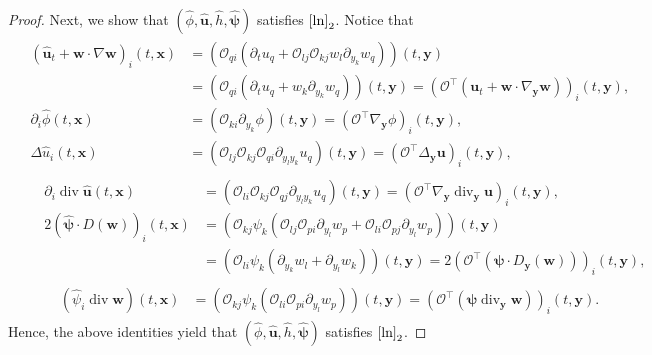 \documentclass[11pt,reqno]{amsart}
\DeclareMathOperator{\diver}{\mathrm{div}}
\numberwithin{rk}{section}
\numberwithin{prop}{section}
\numberwithin{mydef}{section}
\numberwithin{lem}{section}
\numberwithin{equation}{section}
\numberwithin{thm}{section}
\begin{document}
\begin{proof}
Next, we show that $(\hat\phi,\hat{\boldsymbol{u}},\hat h,\hat{\boldsymbol{\psi}})$ satisfies $\eqref{ln}_2$. 
Notice that
\begin{align*}
&\begin{aligned}
(\hat{\boldsymbol{u}}_t+\boldsymbol{w}\cdot\nabla\boldsymbol{w})_i(t,\boldsymbol{x})
&=(\mathcal{O}_{qi} (\partial_tu_q+\mathcal{O}_{lj}\mathcal{O}_{kj} w_l \partial_{y_k}w_q)) (t,\boldsymbol{y}) \\
&=(\mathcal{O}_{qi}(\partial_t u_q+ w_k \partial_{y_k}w_q)) (t,\boldsymbol{y})=(\mathcal{O}^\top (\boldsymbol{u}_t+\boldsymbol{w}\cdot\nabla_{\boldsymbol{y}} \boldsymbol{w}))_i(t,\boldsymbol{y}),\\
\partial_i\hat\phi(t,\boldsymbol{x})&=(\mathcal{O}_{ki}  \partial_{y_k}\phi) (t,\boldsymbol{y})=(\mathcal{O}^\top\nabla_{\boldsymbol{y}}\phi)_i(t,\boldsymbol{y}),\\
\Delta \hat{u}_i(t,\boldsymbol{x})&=(\mathcal{O}_{lj} \mathcal{O}_{kj} \mathcal{O}_{qi}\partial_{y_ly_k}u_q)(t,\boldsymbol{y}) =(\mathcal{O}^\top \Delta_{\boldsymbol{y}} \boldsymbol{u})_i(t,\boldsymbol{y}),
\end{aligned}\\
&  \, \,\,\, \, \,\begin{aligned}
\partial_i\diver\hat{\boldsymbol{u}}(t,\boldsymbol{x})&=(\mathcal{O}_{li}\mathcal{O}_{kj}\mathcal{O}_{qj}\partial_{y_ly_k}u_q)(t,\boldsymbol{y}) =(\mathcal{O}^\top \nabla_{\boldsymbol{y}}\diver_{\boldsymbol{y}}\boldsymbol{u})_i (t,\boldsymbol{y}),\\
2(\hat{\boldsymbol{\psi}}\cdot D(\boldsymbol{w}))_i(t,\boldsymbol{x})
&=(\mathcal{O}_{kj} \psi_k (\mathcal{O}_{lj}\mathcal{O}_{pi} \partial_{y_l}w_p+\mathcal{O}_{li}\mathcal{O}_{pj} \partial_{y_l}w_p))(t,\boldsymbol{y})\\
&=(\mathcal{O}_{li}\psi_k (\partial_{y_k}w_l+ \partial_{y_l}w_k))(t,\boldsymbol{y})=2(\mathcal{O}^\top(\boldsymbol{\psi}\cdot D_{\boldsymbol{y}}(\boldsymbol{w})))_i(t,\boldsymbol{y}),
\end{aligned}\\
&\quad \ \ \, \, \, \,\begin{aligned}
(\hat{\psi}_i\diver\boldsymbol{w})(t,\boldsymbol{x})
&=(\mathcal{O}_{kj} \psi_k (\mathcal{O}_{li}\mathcal{O}_{pi} \partial_{y_l}w_p))(t,\boldsymbol{y}) =(\mathcal{O}^\top(\boldsymbol{\psi}\diver_{\boldsymbol{y}}\boldsymbol{w}))_i(t,\boldsymbol{y}).
\end{aligned}
\end{align*}
Hence, the above identities yield that $(\hat\phi,\hat{\boldsymbol{u}},\hat h,\hat{\boldsymbol{\psi}})$ satisfies $\eqref{ln}_2$.



\end{proof}
\end{document}
